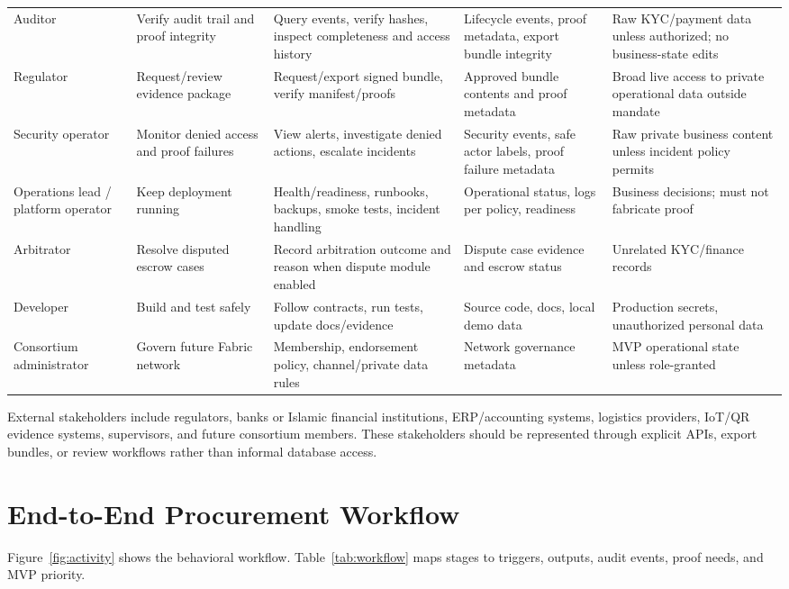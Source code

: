 \documentclass[conference]{IEEEtran}
\begin{document}
\begin{table}[t]
\begin{tabularx}{\textwidth}{P{2.3cm} P{3.5cm} P{3.7cm} Y Y}
Auditor & Verify audit trail and proof integrity & Query events, verify hashes, inspect completeness and access history & Lifecycle events, proof metadata, export bundle integrity & Raw KYC/payment data unless authorized; no business-state edits \\
Regulator & Request/review evidence package & Request/export signed bundle, verify manifest/proofs & Approved bundle contents and proof metadata & Broad live access to private operational data outside mandate \\
Security operator & Monitor denied access and proof failures & View alerts, investigate denied actions, escalate incidents & Security events, safe actor labels, proof failure metadata & Raw private business content unless incident policy permits \\
Operations lead / platform operator & Keep deployment running & Health/readiness, runbooks, backups, smoke tests, incident handling & Operational status, logs per policy, readiness & Business decisions; must not fabricate proof \\
Arbitrator & Resolve disputed escrow cases & Record arbitration outcome and reason when dispute module enabled & Dispute case evidence and escrow status & Unrelated KYC/finance records \\
Developer & Build and test safely & Follow contracts, run tests, update docs/evidence & Source code, docs, local demo data & Production secrets, unauthorized personal data \\
Consortium administrator & Govern future Fabric network & Membership, endorsement policy, channel/private data rules & Network governance metadata & MVP operational state unless role-granted \\
\bottomrule
\end{tabularx}
\end{table}

External stakeholders include regulators, banks or Islamic financial institutions, ERP/accounting systems, logistics providers, IoT/QR evidence systems, supervisors, and future consortium members. These stakeholders should be represented through explicit APIs, export bundles, or review workflows rather than informal database access.

\section{End-to-End Procurement Workflow}
Figure~\ref{fig:activity} shows the behavioral workflow. Table~\ref{tab:workflow} maps stages to triggers, outputs, audit events, proof needs, and MVP priority.
\end{document}
